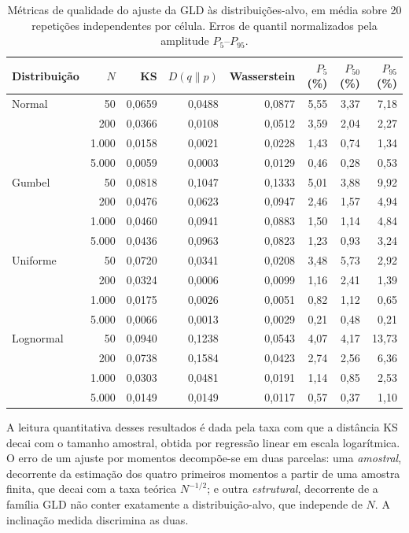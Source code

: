 \begin{table}[htbp]
\centering
\caption{Métricas de qualidade do ajuste da GLD às distribuições-alvo, em média sobre 20 repetições independentes por célula. Erros de quantil normalizados pela amplitude $P_5$--$P_{95}$.}
\label{tab:pyglam_metricas}
\begin{tabular}{lrrrrrrr}
\toprule
\textbf{Distribuição} & \textbf{$N$} & \textbf{KS} & \textbf{$D(q\|p)$} & \textbf{Wasserstein} & \textbf{$P_5$ (\%)} & \textbf{$P_{50}$ (\%)} & \textbf{$P_{95}$ (\%)} \\
\midrule
Normal & 50 & 0,0659 & 0,0488 & 0,0877 & 5,55 & 3,37 & 7,18 \\
 & 200 & 0,0366 & 0,0108 & 0,0512 & 3,59 & 2,04 & 2,27 \\
 & 1.000 & 0,0158 & 0,0021 & 0,0228 & 1,43 & 0,74 & 1,34 \\
 & 5.000 & 0,0059 & 0,0003 & 0,0129 & 0,46 & 0,28 & 0,53 \\
\midrule
Gumbel & 50 & 0,0818 & 0,1047 & 0,1333 & 5,01 & 3,88 & 9,92 \\
 & 200 & 0,0476 & 0,0623 & 0,0947 & 2,46 & 1,57 & 4,94 \\
 & 1.000 & 0,0460 & 0,0941 & 0,0883 & 1,50 & 1,14 & 4,84 \\
 & 5.000 & 0,0436 & 0,0963 & 0,0823 & 1,23 & 0,93 & 3,24 \\
\midrule
Uniforme & 50 & 0,0720 & 0,0341 & 0,0208 & 3,48 & 5,73 & 2,92 \\
 & 200 & 0,0324 & 0,0006 & 0,0099 & 1,16 & 2,41 & 1,39 \\
 & 1.000 & 0,0175 & 0,0026 & 0,0051 & 0,82 & 1,12 & 0,65 \\
 & 5.000 & 0,0066 & 0,0013 & 0,0029 & 0,21 & 0,48 & 0,21 \\
\midrule
Lognormal & 50 & 0,0940 & 0,1238 & 0,0543 & 4,07 & 4,17 & 13,73 \\
 & 200 & 0,0738 & 0,1584 & 0,0423 & 2,74 & 2,56 & 6,36 \\
 & 1.000 & 0,0303 & 0,0481 & 0,0191 & 1,14 & 0,85 & 2,53 \\
 & 5.000 & 0,0149 & 0,0149 & 0,0117 & 0,57 & 0,37 & 1,10 \\
\bottomrule
\end{tabular}
\end{table}

A leitura quantitativa desses resultados é dada pela taxa com que a distância KS decai com o tamanho amostral, obtida por regressão linear em escala logarítmica. O erro de um ajuste por momentos decompõe-se em duas parcelas: uma \textit{amostral}, decorrente da estimação dos quatro primeiros momentos a partir de uma amostra finita, que decai com a taxa teórica $N^{-1/2}$; e outra \textit{estrutural}, decorrente de a família GLD não conter exatamente a distribuição-alvo, que independe de $N$. A inclinação medida discrimina as duas.

